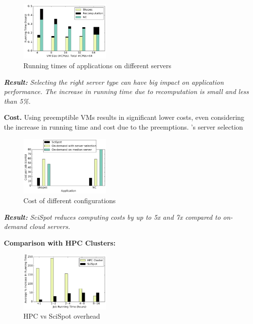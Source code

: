 \begin{figure}
  \centering
  \includegraphics[width=0.4\textwidth]{../graphs/runtime-bars.pdf}
  \caption{Running times of applications on different servers}
  \label{fig:runtimes-bar}
\end{figure}


\noindent \emph{ \textbf{Result:} Selecting the right server type can have big impact on application performance. The increase in running time due to recomputation is small and less than 5\%.}


\noindent \textbf{Cost.} Using preemptible VMs results in significant lower costs, even considering the increase in running time and cost due to the preemptions.
\sysname's server selection 



\begin{figure}
  \centering
  \includegraphics[width=0.4\textwidth]{../graphs/cost-only-bar.pdf}
  \caption{Cost of different configurations}
  \label{fig:cost-only-bar}
\end{figure}

\noindent \emph{ \textbf{Result:} SciSpot reduces computing costs by up to 5x and 7x compared to on-demand cloud servers.}


\noindent \textbf{Comparison with HPC Clusters:}

\begin{figure}[t]
  \centering 
  \includegraphics[width=0.4\textwidth]{../graphs/hpc-vs-scispot.pdf}
  \caption{HPC vs SciSpot overhead}
  \label{fig:hpc-vs-scispot}

\end{figure}

